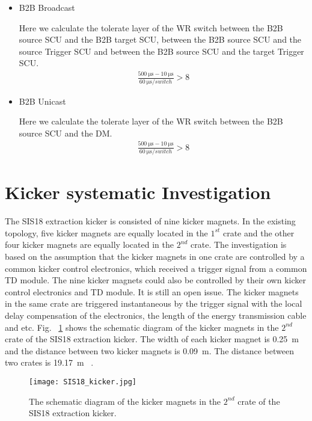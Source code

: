 \begin{itemize}
    \item B2B Broadcast

		Here we calculate the tolerate layer of the WR switch between the B2B source \gls{SCU} and the B2B target SCU, between the B2B source SCU and the source Trigger SCU and between the B2B source SCU and the target Trigger SCU.  
		\begin{equation}
		\begin{aligned}
			\frac{\SI{500}{\us}-\SI{10}{\us}}{\SI{60}{\us/switch}}> 8
		\label {num_switch_b}
		\end{aligned}
		\end{equation}
	\item B2B Unicast

		Here we calculate the tolerate layer of the WR switch between the B2B source SCU and the DM.
		\begin{equation}
		\begin{aligned}
			\frac{\SI{500}{\us}-\SI{10}{\us}}{\SI{60}{\us/switch}}> 8
		\label {num_switch_b}
		\end{aligned}
		\end{equation}
\end{itemize}

\section{Kicker systematic Investigation}
The SIS18 extraction kicker is consisted of nine kicker magnets. In the existing topology, five kicker magnets are equally located in the $1^{st}$ crate and the other four kicker magnets are equally located in the $2^{nd}$ crate. The investigation is based on the assumption that the kicker magnets in one crate are controlled by a common kicker control electronics, which received a trigger signal from a common TD module. The nine kicker magnets could also be controlled by their own kicker control electronics and TD module. It is still an open issue. The kicker magnets in the same crate are triggered instantaneous by the trigger signal with the local delay compensation of the electronics, the length of the energy transmission cable and etc. Fig. ~\ref{SIS18_kicker} shows the schematic diagram of the kicker magnets in the $2^{nd}$ crate of the SIS18 extraction kicker. The width of each kicker magnet is \SI{0.25}{m} and the distance between two kicker magnets is \SI{0.09}{m}. The distance between two crates is \SI{19.17}{m} ~\cite{ros_sis18_2008}. 
\begin{figure}[H]
   \centering   
   \texttt{[image: SIS18\_kicker.jpg]}
   \caption{The schematic diagram of the kicker magnets in the $2^{nd}$ crate of the SIS18 extraction kicker.}
   \label{SIS18_kicker}
\end{figure}

